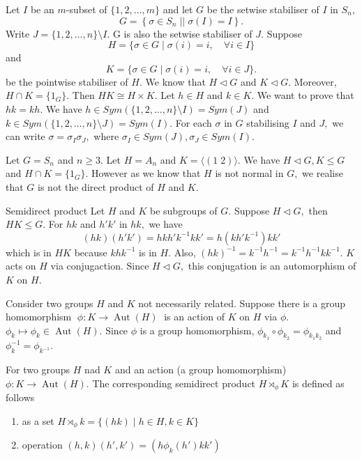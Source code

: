 \begin{example}
	Let $I$ be an $m$\nobreakdash-subset of $\{ 1, 2, \dotsc, m \}$ and
	let $G$ be the setwise stabiliser of $I$ in $S_n,$
	$$ G = \left\{ \sigma \in S_n \; \mid\vert \; \sigma(I) = I \right\} .$$
	Write $J = \{ 1, 2, \dotsc, n  \} \setminus I.$ G is also the setwise 
	stabiliser of $J.$ Suppose 
	$$ H = \{ \sigma \in G \; \vert \; \sigma(i) = i, \quad \forall i \in I \} $$
	and
	$$ K = \{ \sigma \in G \; \vert \; \sigma(i) = i , \quad \forall i \in J \} .$$
	be the pointwise stabiliser of $H.$ We know that $H \triangleleft G$ and 
	$K \triangleleft G.$ Moreover, $H \cap K = \{ 1_G \}.$ Then $HK \cong H \times  K.$
	Let $h \in H$ and $k \in K.$ We want to prove that $hk = kh.$
	We have $ h \in Sym( \{ 1, 2, \dotsc, n \} \setminus I ) = Sym(J)$
	and $k \in Sym( \{ 1, 2, \dotsc, n \} \setminus J) = Sym(I).$
	For each $\sigma$ in $G$ stabilising $I$ and $J,$ we can write
	$\sigma = \sigma_I \sigma_J,$ where $\sigma_I \in Sym(J), \sigma_J \in Sym(I).$
\end{example}


\begin{example}
	Let $G=  S_n$ and $n \geq 3.$ Let $H =  A_n$ and $ K = \langle ( 1 \; 2 ) \rangle .$
	We have $H \triangleleft G, K \leq G$ and $ H \cap K = \{ 1_G \}.$ However 
	as we know that $H$ is not normal in $G,$ we realise that $G$ is not the direct
	product of $H$ and $K.$
\end{example}

Semidirect product
Let $H$ and $K$ be subgroups of $G.$ Suppose $H \triangleleft G,$ then $HK \leq G.$
For $hk$ and $h'k'$ in $hk,$ we have
$$ (hk)(h'k') = hkh' k^{-1} k k' = h (k h' k^{-1}) kk'$$
which is in $HK$ because $k h k^{-1}$ is in $H.$
Also, $(hk)^{-1} = k^{-1} h^{-1} = k^{-1} h^{-1} k k^{-1} .$
$K$ acts on $H$ via conjugaction. Since $ H \triangleleft G,$ this conjugation
is an automorphism of $K$ on $H.$

Consider two groups $H$ and $K$ not necessarily related. Suppose there is a group 
homomorphism $\; \phi \colon K \to \operatorname{Aut}(H) \;$ is an action of $K$ on $H$ via $ \phi.$
$ \phi_k \mapsto \phi_k \in \operatorname{Aut}(H) .$
Since $ \phi$ is a group homomorphism, $ \phi_{k_1} \circ \phi_{k_2} = \phi_{k_1 k_2}$
and $ \phi_{k}^{-1} = \phi_{k^{-1}}.$


\begin{definition}
	For two groups $H$ nad $K$ and an action (a group homomorphism) $\phi \colon K \to 
	\operatorname{Aut}(H) .$ The corresponding semidirect product $H \rtimes_\phi K$
	is defined as follows
	\begin{enumerate}
		\item as a set $H \rtimes_\phi k = \{ (hk) \; | \; h \in H, k \in K\}$
		\item operation $(h,k) (h',k') = (h \phi_k(h') k k')$
	\end{enumerate}
\end{definition}

